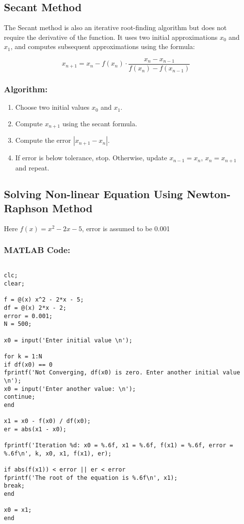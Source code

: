 \documentclass[a4paper,12pt]{article}
\begin{document}
	\subsection{Secant Method}
	The Secant method is also an iterative root-finding algorithm but does not require the derivative of the function. It uses two initial approximations $x_0$ and $x_1$, and computes subsequent approximations using the formula:
	
	\[
	x_{n+1} = x_n - f(x_n) \cdot \frac{x_n - x_{n-1}}{f(x_n) - f(x_{n-1})}
	\]
	
	\subsubsection{Algorithm:}
	\begin{enumerate}
		\item Choose two initial values $x_0$ and $x_1$.
		\item Compute $x_{n+1}$ using the secant formula.
		\item Compute the error $|x_{n+1} - x_n|$.
		\item If error is below tolerance, stop. Otherwise, update $x_{n-1} = x_n$, $x_n = x_{n+1}$ and repeat.
	\end{enumerate}
	
	
	


	\subsection{Solving Non-linear Equation Using Newton-Raphson Method}
	Here $f(x) = x^2 - 2x - 5$, 
	error is assumed to be 0.001 
	
	
	
	\subsubsection{MATLAB Code:}
	\begin{lstlisting}[style=vscode-light, caption={Solving Non-linear Equation Using Newton-Raphson Method in MATLAB.} ]
		
clc;
clear;
	
f = @(x) x^2 - 2*x - 5;  
df = @(x) 2*x - 2;  
error = 0.001;   
N = 500;        
	
x0 = input('Enter initial value \n');  
	
for k = 1:N
if df(x0) == 0
fprintf('Not Converging, df(x0) is zero. Enter another initial value \n');
x0 = input('Enter another value: \n');
continue;  
end
	
x1 = x0 - f(x0) / df(x0);  
er = abs(x1 - x0);         
	
fprintf('Iteration %d: x0 = %.6f, x1 = %.6f, f(x1) = %.6f, error = %.6f\n', k, x0, x1, f(x1), er);
	
if abs(f(x1)) < error || er < error
fprintf('The root of the equation is %.6f\n', x1);
break;
end
	
x0 = x1;  
end
	
		
		
	\end{lstlisting}
	
\end{document}
